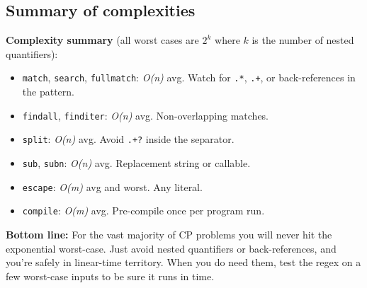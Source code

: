 \subsection*{Summary of complexities}

\textbf{Complexity summary} (all worst cases are $2^k$ where $k$ is the number of nested quantifiers):

\begin{itemize}
    \item \texttt{match}, \texttt{search}, \texttt{fullmatch}: \emph{O(n)} avg. Watch for \texttt{.*}, \texttt{.+}, or back-references in the pattern.
    \item \texttt{findall}, \texttt{finditer}: \emph{O(n)} avg. Non-overlapping matches.
    \item \texttt{split}: \emph{O(n)} avg. Avoid \texttt{.+?} inside the separator.
    \item \texttt{sub}, \texttt{subn}: \emph{O(n)} avg. Replacement string or callable.
    \item \texttt{escape}: \emph{O(m)} avg and worst. Any literal.
    \item \texttt{compile}: \emph{O(m)} avg. Pre-compile once per program run.
\end{itemize}

\medskip

\textbf{Bottom line:} For the vast majority of CP problems you will never hit the exponential worst-case.  Just avoid nested quantifiers or back-references, and you're safely in linear-time territory.  When you do need them, test the regex on a few worst-case inputs to be sure it runs in time.
